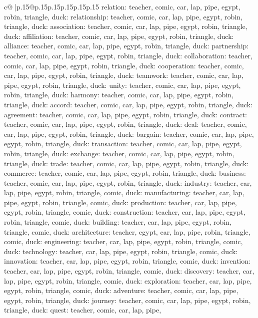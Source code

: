 \documentclass{article}
\begin{document}
{\begin{supertabular}{c@{$\;$}|p{.15\linewidth}@{}p{.15\linewidth}p{.15\linewidth}p{.15\linewidth}p{.15\linewidth}p{.15\linewidth}}
{{{relation\nTARGETS: teacher, comic, car, lap, pipe, egypt, robin, triangle, duck\n\nCLUE: relationship\nTARGETS: teacher, comic, car, lap, pipe, egypt, robin, triangle, duck\n\nCLUE: association\nTARGETS: teacher, comic, car, lap, pipe, egypt, robin, triangle, duck\n\nCLUE: affiliation\nTARGETS: teacher, comic, car, lap, pipe, egypt, robin, triangle, duck\n\nCLUE: alliance\nTARGETS: teacher, comic, car, lap, pipe, egypt, robin, triangle, duck\n\nCLUE: partnership\nTARGETS: teacher, comic, car, lap, pipe, egypt, robin, triangle, duck\n\nCLUE: collaboration\nTARGETS: teacher, comic, car, lap, pipe, egypt, robin, triangle, duck\n\nCLUE: cooperation\nTARGETS: teacher, comic, car, lap, pipe, egypt, robin, triangle, duck\n\nCLUE: teamwork\nTARGETS: teacher, comic, car, lap, pipe, egypt, robin, triangle, duck\n\nCLUE: unity\nTARGETS: teacher, comic, car, lap, pipe, egypt, robin, triangle, duck\n\nCLUE: harmony\nTARGETS: teacher, comic, car, lap, pipe, egypt, robin, triangle, duck\n\nCLUE: accord\nTARGETS: teacher, comic, car, lap, pipe, egypt, robin, triangle, duck\n\nCLUE: agreement\nTARGETS: teacher, comic, car, lap, pipe, egypt, robin, triangle, duck\n\nCLUE: contract\nTARGETS: teacher, comic, car, lap, pipe, egypt, robin, triangle, duck\n\nCLUE: deal\nTARGETS: teacher, comic, car, lap, pipe, egypt, robin, triangle, duck\n\nCLUE: bargain\nTARGETS: teacher, comic, car, lap, pipe, egypt, robin, triangle, duck\n\nCLUE: transaction\nTARGETS: teacher, comic, car, lap, pipe, egypt, robin, triangle, duck\n\nCLUE: exchange\nTARGETS: teacher, comic, car, lap, pipe, egypt, robin, triangle, duck\n\nCLUE: trade\nTARGETS: teacher, comic, car, lap, pipe, egypt, robin, triangle, duck\n\nCLUE: commerce\nTARGETS: teacher, comic, car, lap, pipe, egypt, robin, triangle, duck\n\nCLUE: business\nTARGETS: teacher, comic, car, lap, pipe, egypt, robin, triangle, duck\n\nCLUE: industry\nTARGETS: teacher, car, lap, pipe, egypt, robin, triangle, comic, duck\n\nCLUE: manufacturing\nTARGETS: teacher, car, lap, pipe, egypt, robin, triangle, comic, duck\n\nCLUE: production\nTARGETS: teacher, car, lap, pipe, egypt, robin, triangle, comic, duck\n\nCLUE: construction\nTARGETS: teacher, car, lap, pipe, egypt, robin, triangle, comic, duck\n\nCLUE: building\nTARGETS: teacher, car, lap, pipe, egypt, robin, triangle, comic, duck\n\nCLUE: architecture\nTARGETS: teacher, egypt, car, lap, pipe, robin, triangle, comic, duck\n\nCLUE: engineering\nTARGETS: teacher, car, lap, pipe, egypt, robin, triangle, comic, duck\n\nCLUE: technology\nTARGETS: teacher, car, lap, pipe, egypt, robin, triangle, comic, duck\n\nCLUE: innovation\nTARGETS: teacher, car, lap, pipe, egypt, robin, triangle, comic, duck\n\nCLUE: invention\nTARGETS: teacher, car, lap, pipe, egypt, robin, triangle, comic, duck\n\nCLUE: discovery\nTARGETS: teacher, car, lap, pipe, egypt, robin, triangle, comic, duck\n\nCLUE: exploration\nTARGETS: teacher, car, lap, pipe, egypt, robin, triangle, comic, duck\n\nCLUE: adventure\nTARGETS: teacher, comic, car, lap, pipe, egypt, robin, triangle, duck\n\nCLUE: journey\nTARGETS: teacher, comic, car, lap, pipe, egypt, robin, triangle, duck\n\nCLUE: quest\nTARGETS: teacher, comic, car, lap, pipe, }}}
\end{supertabular}}
\end{document}
